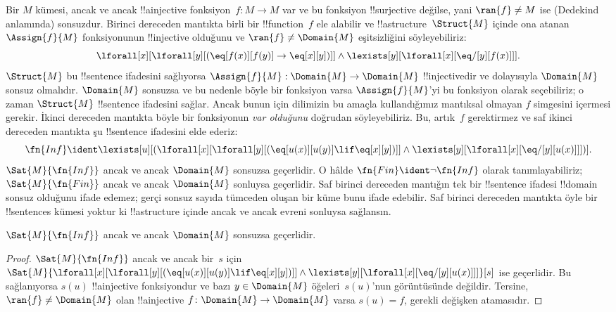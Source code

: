 \documentclass[../../../include/open-logic-section]{subfiles}
\begin{document}


Bir $M$ kümesi, ancak ve ancak !!a{injective} fonksiyon~$f\colon M \to M$
var ve bu fonksiyon !!{surjective} değilse, yani $\ran{f} \neq M$ ise
(Dedekind anlamında) sonsuzdur. Birinci dereceden mantıkta birli bir
!!{function}~$f$ ele alabilir ve !!a{structure}~$\Struct{M}$ içinde ona
atanan~$\Assign{f}{M}$ fonksiyonunun !!{injective} olduğunu ve
$\ran{f} \neq \Domain{M}$ eşitsizliğini söyleyebiliriz:
\[
\lforall[x][\lforall[y][(\eq[f(x)][f(y)] \to \eq[x][y])]] \land
\lexists[y][\lforall[x][\eq/[y][f(x)]]].
\]
$\Struct{M}$ bu !!{sentence} ifadesini sağlıyorsa
$\Assign{f}{M}: \Domain{M} \to \Domain{M}$ !!{injective}{}dir ve
dolayısıyla $\Domain{M}$ sonsuz olmalıdır. $\Domain{M}$ sonsuzsa ve bu
nedenle böyle bir fonksiyon varsa $\Assign{f}{M}$'yi bu fonksiyon olarak
seçebiliriz; o zaman $\Struct{M}$ !!{sentence} ifadesini sağlar. Ancak bunun
için dilimizin bu amaçla kullandığımız mantıksal olmayan $f$ simgesini
içermesi gerekir. İkinci dereceden mantıkta böyle bir fonksiyonun
\emph{var olduğunu} doğrudan söyleyebiliriz. Bu, artık~$f$ gerektirmez ve
saf ikinci dereceden mantıkta şu !!{sentence} ifadesini elde ederiz:
\[
\fn{Inf} \ident \lexists[u][(\lforall[x][\lforall[y][(\eq[u(x)][u(y)]
      \lif \eq[x][y])]] \land \lexists[y][\lforall[x][\eq/[y][u(x)]]])].
\]
$\Sat{M}{\fn{Inf}}$ ancak ve ancak $\Domain{M}$ sonsuzsa geçerlidir.
O hâlde $\fn{Fin} \ident \lnot \fn{Inf}$ olarak tanımlayabiliriz;
$\Sat{M}{\fn{Fin}}$ ancak ve ancak $\Domain{M}$ sonluysa geçerlidir.
Saf birinci dereceden mantığın tek bir !!{sentence} ifadesi !!{domain}
sonsuz olduğunu ifade edemez; gerçi sonsuz sayıda tümceden oluşan bir küme
bunu ifade edebilir. Saf birinci dereceden mantıkta öyle bir !!{sentence}s
kümesi yoktur ki !!a{structure} içinde ancak ve ancak evreni sonluysa sağlansın.

\begin{prop}
$\Sat{M}{\fn{Inf}}$ ancak ve ancak $\Domain{M}$ sonsuzsa geçerlidir.
\end{prop}

\begin{proof}
$\Sat{M}{\fn{Inf}}$ ancak ve ancak bir~$s$ için
  $\Sat{M}{\lforall[x][\lforall[y][(\eq[u(x)][u(y)] \lif \eq[x][y])]]
    \land \lexists[y][\lforall[x][\eq/[y][u(x)]]]}[s]$ ise geçerlidir.
  Bu sağlanıyorsa $s(u)$ !!a{injective} fonksiyondur ve bazı
  $y \in \Domain{M}$ öğeleri~$s(u)$'nun görüntüsünde değildir. Tersine,
  $\ran{f} \neq \Domain{M}$ olan !!a{injective}
  $f\colon \Domain{M} \to \Domain{M}$ varsa $s(u)=f$, gerekli değişken
  atamasıdır.
\end{proof}
\end{document}
